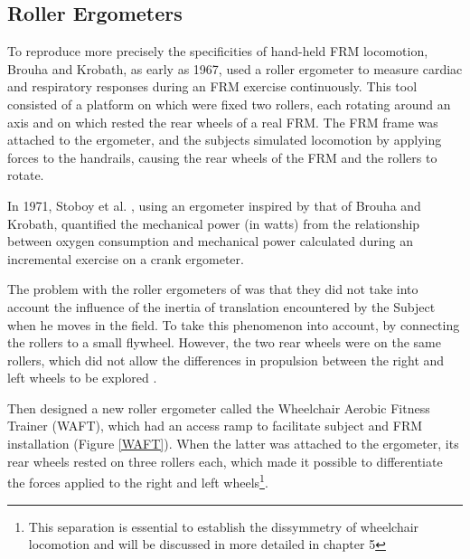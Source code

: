 \subsection{Roller Ergometers}
To reproduce more precisely the specificities of hand-held FRM locomotion, Brouha and Krobath\cite{brouha1967continuous}, as early as 1967, used a roller ergometer to measure cardiac and respiratory responses during an FRM exercise continuously. This tool consisted of a platform on which were fixed two rollers, each rotating around an axis and on which rested the rear wheels of a real FRM. The FRM frame was attached to the ergometer, and the subjects simulated locomotion by applying forces to the handrails, causing the rear wheels of the FRM and the rollers to rotate. 


In 1971, Stoboy et al. \cite{stoboy1971workload}, using an ergometer inspired by that of Brouha and Krobath, quantified the mechanical power (in watts) from the relationship between oxygen consumption and mechanical power calculated during an incremental exercise on a crank ergometer.


The problem with the roller ergometers of \cite{brouha1967continuous, stoboy1971workload} was that they did not take into account the influence of the inertia of translation encountered by the Subject when he moves in the field. To take this phenomenon into account, by connecting the rollers to a small flywheel. However, the two rear wheels were on the same rollers, which did not allow the differences in propulsion between the right and left wheels to be explored \cite{brouha1967continuous, stoboy1971workload}.



Then \cite{langbein1993research, langbein1993calibration, langbein1994initial}  designed a new roller ergometer called the Wheelchair Aerobic Fitness Trainer (WAFT), which had an access ramp to facilitate subject and FRM installation (Figure \ref{WAFT}). When the latter was attached to the ergometer, its rear wheels rested on three rollers each, which made it possible to differentiate the forces applied to the right and left wheels\footnote{This separation is essential to establish the dissymmetry of wheelchair locomotion and will be discussed in more detailed in chapter 5}.

